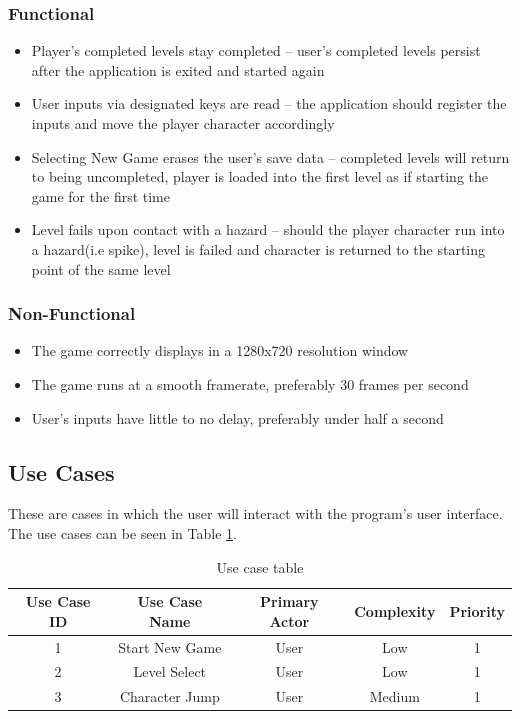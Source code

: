 \documentclass[10pt,conference,onecolumn,compsoc]{IEEEtran}
\begin{document}
\subsubsection{Functional}
\begin{itemize}
\item Player's completed levels stay completed – user's completed levels persist after the application is exited and started again
\item User inputs via designated keys are read – the application should register the inputs and move the player character accordingly
\item Selecting New Game erases the user's save data – completed levels will return to being uncompleted, player is loaded into the first level as if starting the game for the first time
\item Level fails upon contact with a hazard – should the player character run into a hazard(i.e spike), level is failed and character is returned to the starting point of the same level
\end{itemize}

\subsubsection{Non-Functional}
\begin{itemize}
\item The game correctly displays in a 1280x720 resolution window
\item The game runs at a smooth framerate, preferably 30 frames per second
\item User's inputs have little to no delay, preferably under half a second
\end{itemize}

\subsection{Use Cases}
These are cases in which the user will interact with the program's user interface. The use cases can be seen in Table \ref{tab:useCaseIndex}.




\begin{table}
\centering
\begin{tabular}{|c|c|c|c|c|}
\hline
Use Case ID & Use Case Name & Primary Actor & Complexity & Priority \\
\hline \hline
1 & Start New Game & User & Low & 1\\
\hline
2 & Level Select & User & Low & 1\\
\hline
3 & Character Jump & User & Medium & 1\\
\hline

\end{tabular}
\caption{Use case table}
\label{tab:useCaseIndex}
\end{table}
\end{document}
